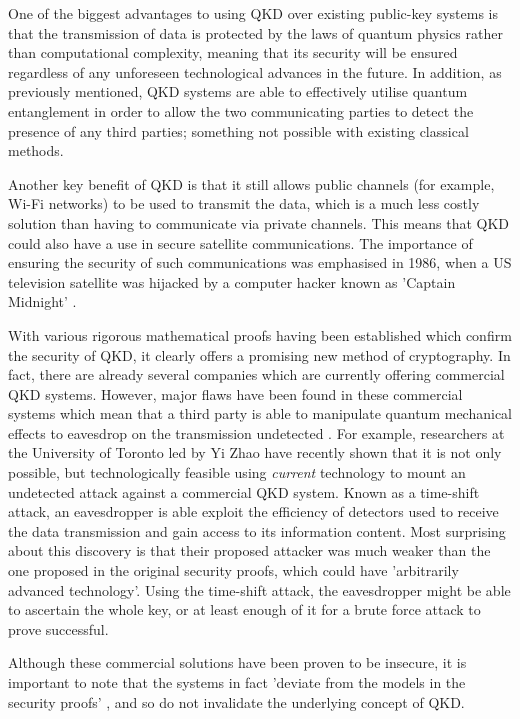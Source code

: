 \documentclass[runningheads,a4paper]{llncs}
\begin{document}
One of the biggest advantages to using QKD over existing public-key systems is that the transmission of data is protected by the laws of quantum physics rather than computational complexity, meaning that its security will be ensured regardless of any unforeseen technological advances in the future. In addition, as previously mentioned, QKD systems are able to effectively utilise quantum entanglement in order to allow the two communicating parties to detect the presence of any third parties; something not possible with existing classical methods. 

Another key benefit of QKD is that it still allows public channels (for example, Wi-Fi networks) to be used to transmit the data, which is a much less costly solution than having to communicate via private channels. This means that QKD could also have a use in secure satellite communications. The importance of ensuring the security of such communications was emphasised in 1986, when a US television satellite was hijacked by a computer hacker known as 'Captain Midnight' \cite{Hughes:2000uq}.

With various rigorous mathematical proofs having been established which confirm the security of QKD\cite{Deutsch:1996fk,Shor:2000uq}, it clearly offers a promising new method of cryptography. In fact, there are already several companies which are currently offering commercial QKD systems. However, major flaws have been found in these commercial systems which mean that a third party is able to manipulate quantum mechanical effects to eavesdrop on the transmission undetected \cite{Wiechers:2011fk,Zhao:2008fk}. For example, researchers at the University of Toronto led by Yi Zhao have recently shown that it is not only possible, but technologically feasible using \emph{current} technology to mount an undetected attack against a commercial QKD system. Known as a time-shift attack, an eavesdropper is able exploit the efficiency of detectors used to receive the data transmission and gain access to its information content. Most surprising about this discovery is that their proposed attacker was much weaker than the one proposed in the original security proofs, which could have 'arbitrarily advanced technology'. Using the time-shift attack, the eavesdropper might be able to ascertain the whole key, or at least enough of it for a brute force attack to prove successful. 

Although these commercial solutions have been proven to be insecure, it is important to note that the systems in fact 'deviate from the models in the security proofs' \cite{Lydersen:2010qy}, and so do not invalidate the underlying concept of QKD. 
\end{document}
